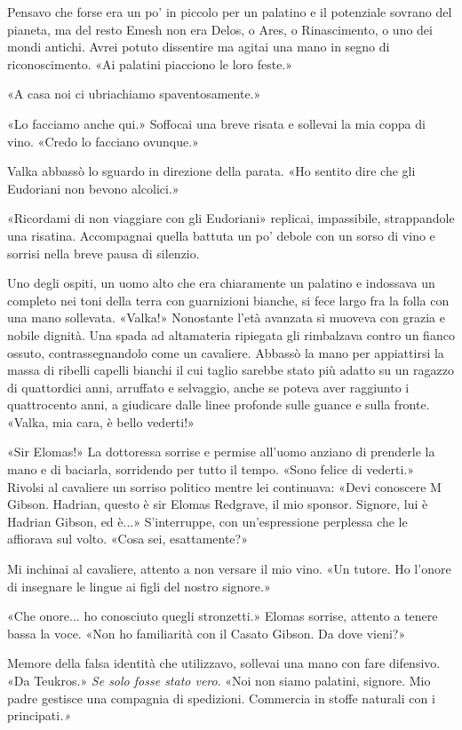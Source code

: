 Pensavo che forse era un po' in piccolo per un palatino e il potenziale
sovrano del pianeta, ma del resto Emesh non era Delos, o Ares, o
Rinascimento, o uno dei mondi antichi. Avrei potuto dissentire ma agitai
una mano in segno di riconoscimento. «Ai palatini piacciono le loro
feste.»

«A casa noi ci ubriachiamo spaventosamente.»

«Lo facciamo anche qui.» Soffocai una breve risata e sollevai la mia
coppa di vino. «Credo lo facciano ovunque.»

Valka abbassò lo sguardo in direzione della parata. «Ho sentito dire che
gli Eudoriani non bevono alcolici.»

«Ricordami di non viaggiare con gli Eudoriani» replicai, impassibile,
strappandole una risatina. Accompagnai quella battuta un po' debole con
un sorso di vino e sorrisi nella breve pausa di silenzio.

Uno degli ospiti, un uomo alto che era chiaramente un palatino e
indossava un completo nei toni della terra con guarnizioni bianche, si
fece largo fra la folla con una mano sollevata. «Valka!» Nonostante
l'età avanzata si muoveva con grazia e nobile dignità. Una spada ad
altamateria ripiegata gli rimbalzava contro un fianco ossuto,
contrassegnandolo come un cavaliere. Abbassò la mano per appiattirsi la
massa di ribelli capelli bianchi il cui taglio sarebbe stato più adatto
su un ragazzo di quattordici anni, arruffato e selvaggio, anche se
poteva aver raggiunto i quattrocento anni, a giudicare dalle linee
profonde sulle guance e sulla fronte. «Valka, mia cara, è bello
vederti!»

«Sir Elomas!» La dottoressa sorrise e permise all'uomo anziano di
prenderle la mano e di baciarla, sorridendo per tutto il tempo. «Sono
felice di vederti.» Rivolsi al cavaliere un sorriso politico mentre lei
continuava: «Devi conoscere M Gibson. Hadrian, questo è sir Elomas
Redgrave, il mio sponsor. Signore, lui è Hadrian Gibson, ed è...»
S'interruppe, con un'espressione perplessa che le affiorava sul volto.
«Cosa sei, esattamente?»

Mi inchinai al cavaliere, attento a non versare il mio vino. «Un tutore.
Ho l'onore di insegnare le lingue ai figli del nostro signore.»

«Che onore... ho conosciuto quegli stronzetti.» Elomas sorrise, attento
a tenere bassa la voce. «Non ho familiarità con il Casato Gibson. Da
dove vieni?»

Memore della falsa identità che utilizzavo, sollevai una mano con fare
difensivo. «Da Teukros.» \emph{Se solo fosse stato vero}. «Noi non siamo
palatini, signore. Mio padre gestisce una compagnia di spedizioni.
Commercia in stoffe naturali con i principati\emph{.»}

